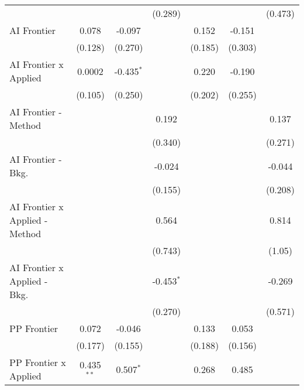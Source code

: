 \begin{tabular}{lcccccc}
                                  &              &               & (0.289)       &               &                & (0.473)\\   
   AI Frontier                    & 0.078        & -0.097        &               & 0.152         & -0.151         &   \\   
                                  & (0.128)      & (0.270)       &               & (0.185)       & (0.303)        &   \\   
   AI Frontier x Applied          & 0.0002       & -0.435$^{*}$  &               & 0.220         & -0.190         &   \\   
                                  & (0.105)      & (0.250)       &               & (0.202)       & (0.255)        &   \\   
   AI Frontier - Method           &              &               & 0.192         &               &                & 0.137\\   
                                  &              &               & (0.340)       &               &                & (0.271)\\   
   AI Frontier - Bkg.             &              &               & -0.024        &               &                & -0.044\\   
                                  &              &               & (0.155)       &               &                & (0.208)\\   
   AI Frontier x Applied - Method &              &               & 0.564         &               &                & 0.814\\   
                                  &              &               & (0.743)       &               &                & (1.05)\\   
   AI Frontier x Applied - Bkg.   &              &               & -0.453$^{*}$  &               &                & -0.269\\   
                                  &              &               & (0.270)       &               &                & (0.571)\\   
   PP Frontier                    & 0.072        & -0.046        &               & 0.133         & 0.053          &   \\   
                                  & (0.177)      & (0.155)       &               & (0.188)       & (0.156)        &   \\   
   PP Frontier x Applied          & 0.435$^{**}$ & 0.507$^{*}$   &               & 0.268         & 0.485          &   \\   

\end{tabular}
